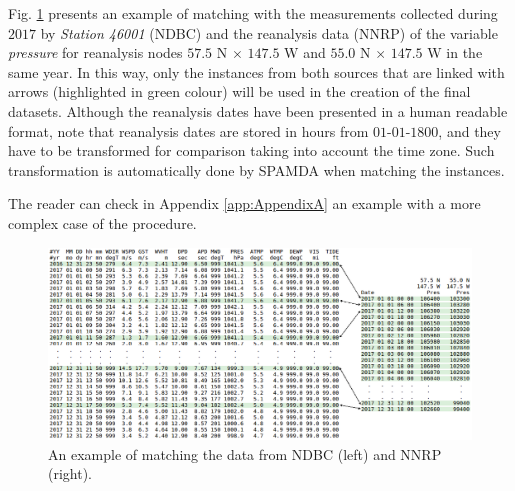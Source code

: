 \documentclass[energies,article,submit,moreauthors,pdftex]{Definitions/mdpi}
\begin{document}
				Fig. \ref{fig:matchingProcess} presents an example of matching with the measurements collected during $2017$ by \textit{Station 46001} (NDBC) and the reanalysis data (NNRP) of the variable \textit{pressure} for reanalysis nodes $57.5$ N $\times$ $147.5$ W and $55.0$ N $\times$ $147.5$ W in the same year. In this way, only the instances from both sources that are linked with arrows (highlighted in green colour) will be used in the creation of the final datasets. Although the reanalysis dates have been presented in a human readable format, note that reanalysis dates are stored in hours from $01$-$01$-$1800$, and they have to be transformed for comparison taking into account the time zone. Such transformation is automatically done by SPAMDA when matching the instances.
				
				The reader can check in Appendix \ref{app:AppendixA} an example with a more complex case of the procedure.
				\begin{figure}[ht!]
					\centering
					\includegraphics[scale=0.43]{figures/FigureMatchingProcess.png}
					\caption{An example of matching the data from NDBC (left) and NNRP (right).}
					\label{fig:matchingProcess}
				\end{figure}
				
\end{document}
